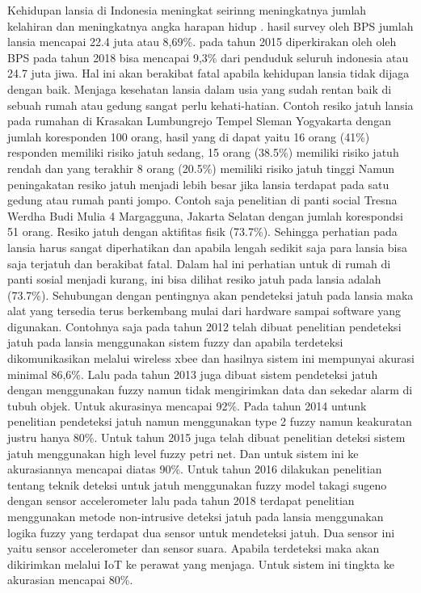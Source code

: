 \documentclass[11pt]{article}
\numberwithin{equation}{subsection}
\begin{document}
	Kehidupan lansia di Indonesia meningkat seirinng meningkatnya jumlah kelahiran dan meningkatnya angka harapan hidup .
	hasil survey oleh  BPS  jumlah lansia mencapai 22.4 juta atau  8,69\%. pada tahun 2015\cite{Kesehatan}
	diperkirakan oleh oleh BPS pada tahun 2018 bisa mencapai 9,3\% dari penduduk seluruh indonesia atau 24.7 juta jiwa.
	Hal ini akan berakibat fatal apabila kehidupan lansia tidak dijaga dengan baik.
	Menjaga kesehatan lansia dalam usia yang sudah rentan baik di sebuah rumah atau gedung sangat perlu kehati-hatian.
	Contoh resiko jatuh lansia pada rumahan di Krasakan Lumbungrejo Tempel Sleman Yogyakarta dengan jumlah koresponden 100 orang, hasil yang di dapat  yaitu 16 orang (41\%) responden memiliki risiko jatuh sedang, 15 orang (38.5\%) memiliki risiko jatuh rendah
	dan yang terakhir 8 orang (20.5\%) memiliki risiko jatuh tinggi \cite{Utami2017a}
	Namun peningakatan resiko jatuh menjadi lebih besar jika lansia terdapat pada satu gedung atau rumah panti jompo.
	Contoh saja penelitian di panti social Tresna Werdha Budi Mulia 4 Margagguna, Jakarta Selatan dengan jumlah korespondsi 51 orang.
	Resiko jatuh dengan aktifitas fisik (73.7\%).
	Sehingga perhatian pada lansia harus sangat diperhatikan dan apabila lengah sedikit saja para lansia bisa saja terjatuh dan berakibat fatal.
	Dalam hal ini perhatian untuk di rumah di panti sosial menjadi kurang, ini bisa dilihat resiko jatuh pada lansia adalah (73.7\%).
	Sehubungan dengan pentingnya akan pendeteksi jatuh pada lansia maka alat yang tersedia terus berkembang mulai dari hardware sampai software yang digunakan.
	Contohnya saja pada tahun 2012 telah dibuat penelitian pendeteksi jatuh pada lansia menggunakan sistem fuzzy dan apabila terdeteksi dikomunikasikan melalui wireless xbee dan hasilnya sistem ini mempunyai akurasi minimal 86,6\%.
	Lalu pada tahun 2013 juga dibuat sistem pendeteksi jatuh dengan menggunakan fuzzy namun tidak mengirimkan data dan sekedar alarm di tubuh objek.
	Untuk akurasinya mencapai 92\%.
	Pada tahun 2014 untunk penelitian pendeteksi jatuh namun menggunakan type 2 fuzzy namun keakuratan justru hanya 80\%.
	Untuk tahun 2015 juga telah dibuat penelitian deteksi sistem jatuh menggunakan high level fuzzy petri net.
	Dan untuk sistem ini ke akurasiannya mencapai diatas 90\%.
	Untuk tahun 2016 dilakukan penelitian tentang teknik deteksi untuk jatuh menggunakan fuzzy model takagi sugeno dengan sensor accelerometer lalu pada tahun 2018 terdapat penelitian menggunakan metode non-intrusive deteksi jatuh pada lansia menggunakan logika fuzzy yang terdapat dua sensor untuk mendeteksi jatuh.
	Dua sensor ini yaitu sensor accelerometer dan sensor suara.
	Apabila terdeteksi maka akan dikirimkan melalui IoT ke perawat yang menjaga. Untuk sistem ini tingkta ke akurasian mencapai 80\%.
\end{document}
